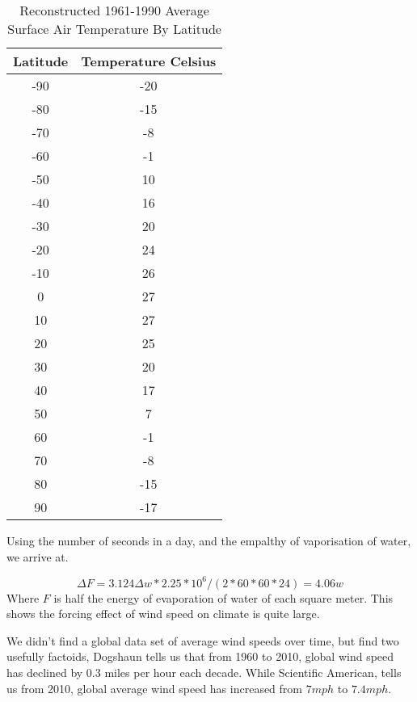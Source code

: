 \documentclass{book}
\begin{document}
      \begin{table}
      	\caption{Reconstructed 1961-1990 Average Surface Air Temperature By Latitude}
      	\centering
      	\begin{tabular} { c c}
      		\hline\hline
      		Latitude & Temperature Celsius \\ 
      		\hline
      		-90 & -20 \\
      		-80 & -15 \\
      		-70 & -8 \\
      		-60 & -1 \\
      		-50 & 10 \\
      		-40 & 16 \\
      		-30 & 20 \\
      		-20 & 24 \\
      		-10 & 26 \\
      		0 & 27 \\
      		10 & 27 \\
      		20 & 25 \\
      		30 & 20 \\
      		40 & 17 \\
      		50 & 7 \\
      		60 & -1 \\
      		70 & -8 \\
      		80 & -15 \\
      		90 & -17 \\
      		\hline
      	\end{tabular}
      \end{table}    
      
      
   Using the number of seconds in a day, and the empalthy of vaporisation of water, we arrive at.
   
   \begin{equation}
   	\Delta F = 3.124 \Delta w * 2.25*10^{6} / (2*60*60*24)  = 4.06 w
   \end{equation}
   Where $F$ is half the energy of evaporation of water of each square meter. This shows the forcing effect of wind speed on climate is quite large.
   
   We didn't find a global data set of average wind speeds over time, but find two usefully factoids, \cite{Horizion}  Dogshaun tells us that from 1960 to 2010, global wind speed has declined by $0.3$ miles per hour each decade.
   While \cite{SciAmWind} Scientific American, tells us from 2010, global average wind speed has increased from $7 mph$ to $7.4 mph$.
   
\end{document}
